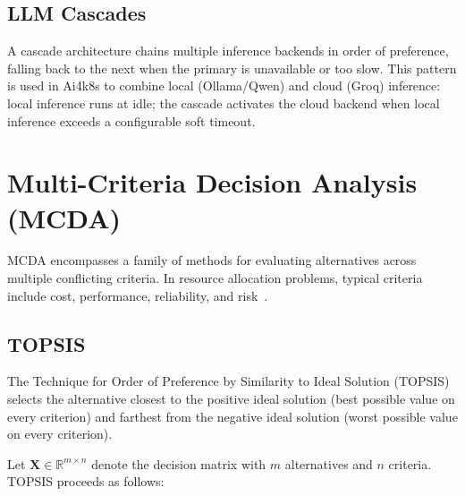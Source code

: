 \subsection{LLM Cascades}
A cascade architecture chains multiple inference backends in order of preference,
falling back to the next when the primary is unavailable or too slow. This pattern
is used in Ai4k8s to combine local (Ollama/Qwen) and cloud (Groq) inference:
local inference runs at idle; the cascade activates the cloud backend when local
inference exceeds a configurable soft timeout.

\section{Multi-Criteria Decision Analysis (MCDA)}
\label{sec:mcda}

\gls{MCDA} encompasses a family of methods for evaluating alternatives across
multiple conflicting criteria. In resource allocation problems, typical criteria
include cost, performance, reliability, and risk~\cite{hwang1981topsis}.

\subsection{TOPSIS}
\label{sec:topsis}

The Technique for Order of Preference by Similarity to Ideal Solution
(TOPSIS)~\cite{hwang1981topsis} selects the alternative closest to the positive
ideal solution (best possible value on every criterion) and farthest from the
negative ideal solution (worst possible value on every criterion).

Let $\mathbf{X} \in \mathbb{R}^{m \times n}$ denote the decision matrix with $m$
alternatives and $n$ criteria. TOPSIS proceeds as follows:

